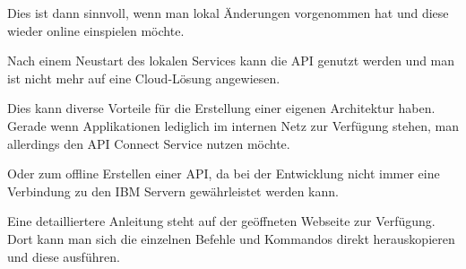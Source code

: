 Dies ist dann sinnvoll, wenn man lokal Änderungen vorgenommen hat und diese wieder online einspielen möchte.

Nach einem Neustart des lokalen Services kann die API genutzt werden und man ist nicht mehr auf eine Cloud-Lösung
angewiesen.

Dies kann diverse Vorteile für die Erstellung einer eigenen Architektur haben. Gerade wenn Applikationen lediglich im
internen Netz zur Verfügung stehen, man allerdings den API Connect Service nutzen möchte.

Oder zum offline Erstellen einer API, da bei der Entwicklung nicht immer eine Verbindung zu den IBM Servern gewährleistet
werden kann.

Eine detailliertere Anleitung steht auf der geöffneten Webseite zur Verfügung. Dort kann man sich die einzelnen Befehle
und Kommandos direkt herauskopieren und diese ausführen.